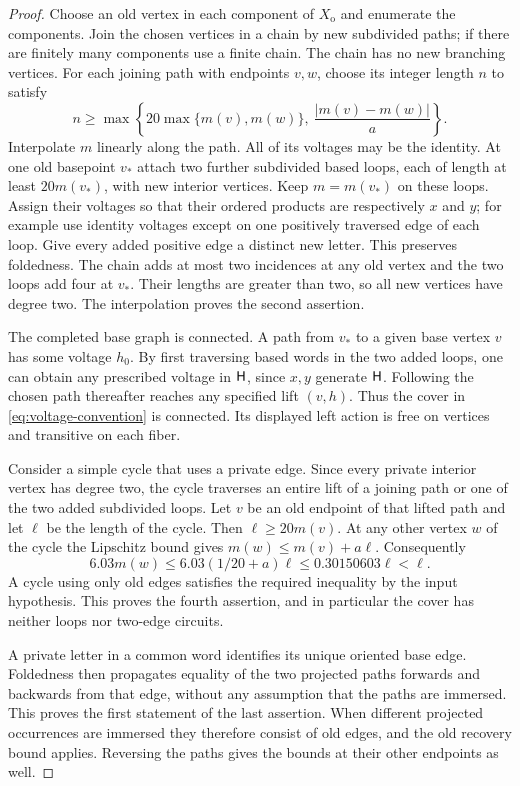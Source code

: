 \begin{proof}
Choose an old vertex in each component of $X_{\mathrm o}$ and enumerate the
components.  Join the chosen vertices in a chain by new subdivided paths;
if there are finitely many components use a finite chain.  The chain has
no new branching vertices.  For each joining path with endpoints $v,w$,
choose its integer length $n$ to satisfy
\begin{equation}\label{eq:private-length}
 n\ge\max\left\{20\max\{m(v),m(w)\},\ \frac{|m(v)-m(w)|}{a}\right\}.
\end{equation}
Interpolate $m$ linearly along the path.  All of its voltages may be the
identity.  At one old basepoint $v_*$ attach two further subdivided based
loops, each of length at least $20m(v_*)$, with new interior vertices.
Keep $m=m(v_*)$ on these loops.  Assign their voltages so that their ordered
products are respectively $x$ and $y$; for example use identity voltages
except on one positively traversed edge of each loop.  Give every added
positive edge a distinct new letter.  This preserves foldedness.  The chain
adds at most two incidences at any old vertex and the two loops add four
at $v_*$.  Their lengths are greater than two, so all new vertices have
degree two.  The interpolation proves the second assertion.

The completed base graph is connected.  A path from $v_*$ to a given base
vertex $v$ has some voltage $h_0$.  By first traversing based words in the
two added loops, one can obtain any prescribed voltage in $\mathsf H$, since
$x,y$ generate $\mathsf H$.  Following the chosen path thereafter reaches any
specified lift $(v,h)$.  Thus the cover in
\eqref{eq:voltage-convention} is connected.  Its displayed left action is
free on vertices and transitive on each fiber.

Consider a simple cycle that uses a private edge.  Since every private
interior vertex has degree two, the cycle traverses an entire lift of a
joining path or one of the two added subdivided loops.  Let $v$ be an old
endpoint of that lifted path and let $\ell$ be the length of the cycle.
Then $\ell\ge20m(v)$.  At any other vertex $w$ of the cycle the Lipschitz
bound gives $m(w)\le m(v)+a\ell$.  Consequently
\[
 6.03m(w)\le6.03(1/20+a)\ell
 \le0.30150603\ell<\ell.
\]
A cycle using only old edges satisfies the required inequality by the input
hypothesis.  This proves the fourth assertion, and in particular the cover
has neither loops nor two-edge circuits.

A private letter in a common word identifies its unique oriented base edge.
Foldedness then propagates equality of the two projected paths forwards
and backwards from that edge, without any assumption that the paths are
immersed.  This proves the first statement of the last assertion.
When different projected occurrences are immersed they therefore consist
of old edges, and the old recovery bound applies.  Reversing the paths
gives the bounds at their other endpoints as well.
\end{proof}

